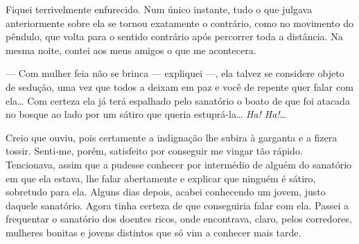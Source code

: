 Fiquei terrivelmente enfurecido. Num único instante, tudo o que julgava
anteriormente sobre ela se tornou exatamente o contrário, como no
movimento do pêndulo, que volta para o sentido contrário após percorrer
toda a distância. Na mesma noite, contei aos meus amigos o que me
acontecera.

--- Com mulher feia não se brinca --- expliquei ---, ela talvez se
considere objeto de sedução, uma vez que todos a deixam em paz e você de
repente quer falar com ela\ldots{} Com certeza ela já terá espalhado
pelo sanatório o boato de que foi atacada no bosque ao lado por um
sátiro que queria estuprá-la\ldots{} \emph{Ha! Ha!}\ldots{}




Creio que ouviu, pois certamente a indignação lhe subira à garganta e a
fizera tossir. Senti-me, porém, satisfeito por conseguir me vingar tão
rápido. Tencionava, assim que a pudesse conhecer por intermédio de
alguém do sanatório em que ela estava, lhe falar abertamente e explicar
que ninguém é sátiro, sobretudo para ela. Alguns dias depois, acabei
conhecendo um jovem, justo daquele sanatório. Agora tinha certeza de que
conseguiria falar com ela. Passei a frequentar o sanatório dos doentes
ricos, onde encontrava, claro, pelos corredores, mulheres bonitas e
jovens distintos que só vim a conhecer mais tarde.



